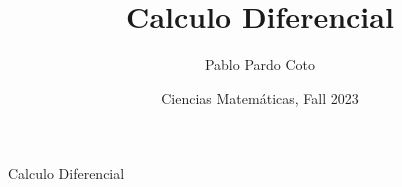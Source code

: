 \documentclass[a4paper,11pt,final]{article}
\title{Calculo Diferencial}
\date{Ciencias Matemáticas, Fall 2023}
\author{Pablo Pardo Coto}
\begin{document}
\begin{titlepage}
    \centering\Large\null\vfill

    \Huge Calculo Diferencial\\ 
    \vspace{1em}

    \vskip8cm

    \vskip4cm
\end{titlepage}

\newpage
\pagestyle{plain}    
\tableofcontents
\newpage


\end{document}

